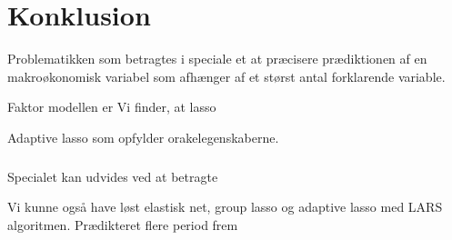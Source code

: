 \chapter{Konklusion}

Problematikken som betragtes i speciale et at præcisere prædiktionen af en makroøkonomisk variabel som afhænger af et størst antal forklarende variable.


Faktor modellen er 
Vi finder, at lasso



Adaptive lasso som opfylder orakelegenskaberne.


\paragraph{}
Specialet kan udvides ved at betragte 

Vi kunne også have løst elastisk net, group lasso og adaptive lasso med LARS algoritmen.
Prædikteret flere period frem